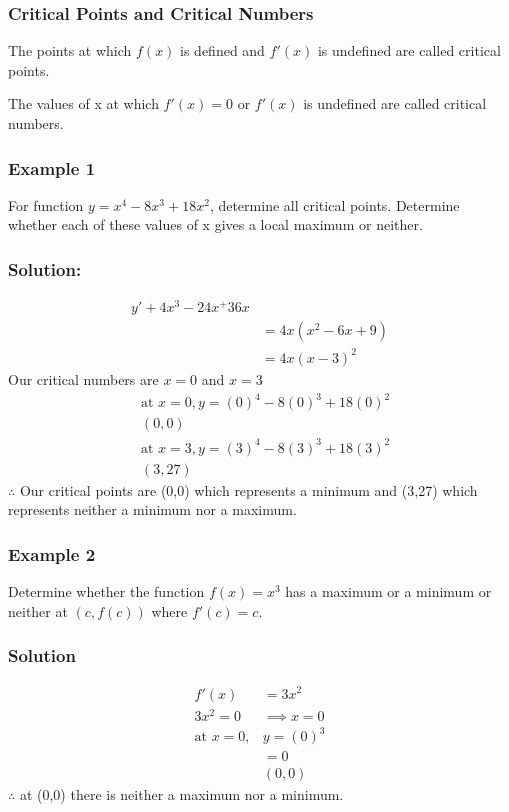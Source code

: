 \documentclass{article}
\begin{document}
\subsubsection{Critical Points and Critical Numbers}
The points at which $f(x)$ is defined and $f'(x)$ is undefined are called critical points.

The values of x at which $f'(x)=0$ or $f'(x)$ is undefined are called critical numbers.

\subsubsection{Example 1}
For function $y=x^4-8x^3+18x^2$, determine all critical points. Determine whether each of these values of x gives a local maximum or neither.
\subsubsection*{Solution:}
\begin{align*}
    y'+4x^3-24x^+36x\\
    &=4x(x^2-6x+9)\\
    &=4x(x-3)^2
\end{align*}
Our critical numbers are $x=0$ and $x=3$\\
\begin{align*}
    &\text{at } x=0, y=(0)^4-8(0)^3+18(0)^2\\
    &(0,0)\\
    &\text{at } x=3, y=(3)^4-8(3)^3+18(3)^2\\
    &(3,27)
\end{align*}
$\therefore$ Our critical points are (0,0) which represents a minimum and (3,27) which represents neither a minimum nor a maximum.
\subsubsection{Example 2}
Determine whether the function $f(x)=x^3$ has a maximum or a minimum or neither at $(c, f(c))$ where $f'(c)=c.$
\subsubsection*{Solution}
\begin{align*}
    f'(x)&=3x^2\\
    3x^2=0 &\implies x=0\\
    \text{at } x=0,& y=(0)^3\\
    &=0\\
    &(0,0)
\end{align*}
$\therefore$ at (0,0) there is neither a maximum nor a minimum.
\end{document}

